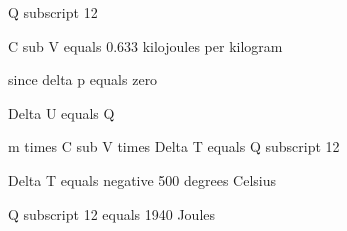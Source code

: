 Q subscript 12

C sub V equals 0.633 kilojoules per kilogram

since delta p equals zero

Delta U equals Q

m times C sub V times Delta T equals Q subscript 12

Delta T equals negative 500 degrees Celsius

Q subscript 12 equals 1940 Joules